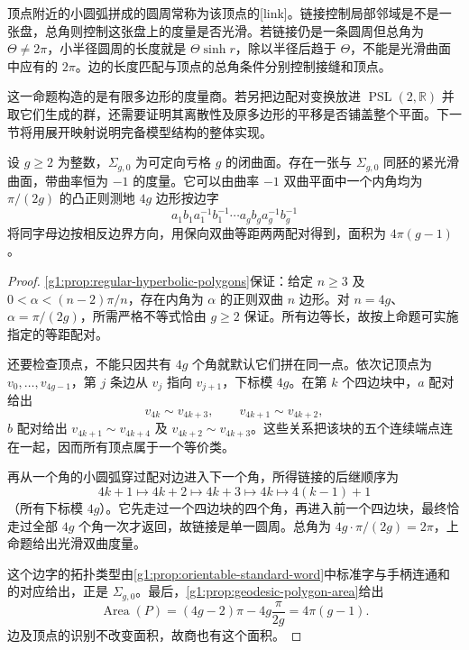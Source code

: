 顶点附近的小圆弧拼成的圆周常称为该顶点的[link]。链接控制局部邻域是不是一张盘，总角则控制这张盘上的度量是否光滑。若链接仍是一条圆周但总角为 \(\Theta\ne2\pi\)，小半径圆周的长度就是 \(\Theta\sinh r\)，除以半径后趋于 \(\Theta\)，不能是光滑曲面中应有的 \(2\pi\)。边的长度匹配与顶点的总角条件分别控制接缝和顶点。

\ProseParagraphBreak

这一命题构造的是有限多边形的度量商。若另把边配对变换放进 \(\operatorname{PSL}(2,\mathbb R)\) 并取它们生成的群，还需要证明其离散性及原多边形的平移是否铺盖整个平面。下一节将用展开映射说明完备模型结构的整体实现。

\begin{theorem}\label{g1:thm:closed-hyperbolic-polygon}
	设 \(g\ge2\) 为整数，\(\Sigma_{g,0}\) 为可定向亏格 \(g\) 的闭曲面。存在一张与 \(\Sigma_{g,0}\) 同胚的紧光滑曲面，带曲率恒为 \(-1\) 的度量。它可以由曲率 \(-1\) 双曲平面中一个内角均为 \(\pi/(2g)\) 的凸正则测地 \(4g\) 边形按边字
	\[
		a_1b_1a_1^{-1}b_1^{-1}\cdots a_gb_ga_g^{-1}b_g^{-1}
	\]
	将同字母边按相反边界方向，用保向双曲等距两两配对得到，面积为 \(4\pi(g-1)\)。
\end{theorem}
\begin{proof}
	\cref{g1:prop:regular-hyperbolic-polygons}保证：给定 \(n\ge3\) 及 \(0<\alpha<(n-2)\pi/n\)，存在内角为 \(\alpha\) 的正则双曲 \(n\) 边形。对 \(n=4g\)、\(\alpha=\pi/(2g)\)，所需严格不等式恰由 \(g\ge2\) 保证。所有边等长，故按上命题可实施指定的等距配对。

	还要检查顶点，不能只因共有 \(4g\) 个角就默认它们拼在同一点。依次记顶点为 \(v_0,\ldots,v_{4g-1}\)，第 \(j\) 条边从 \(v_j\) 指向 \(v_{j+1}\)，下标模 \(4g\)。在第 \(k\) 个四边块中，\(a\) 配对给出
	\[
		v_{4k}\sim v_{4k+3},\qquad v_{4k+1}\sim v_{4k+2},
	\]
	\(b\) 配对给出 \(v_{4k+1}\sim v_{4k+4}\) 及 \(v_{4k+2}\sim v_{4k+3}\)。这些关系把该块的五个连续端点连在一起，因而所有顶点属于一个等价类。

	再从一个角的小圆弧穿过配对边进入下一个角，所得链接的后继顺序为
	\[
		4k+1\longmapsto4k+2\longmapsto4k+3\longmapsto4k
		\longmapsto4(k-1)+1
	\]
	（所有下标模 \(4g\)）。它先走过一个四边块的四个角，再进入前一个四边块，最终恰走过全部 \(4g\) 个角一次才返回，故链接是单一圆周。总角为 \(4g\cdot\pi/(2g)=2\pi\)，上命题给出光滑双曲度量。

	这个边字的拓扑类型由\cref{g1:prop:orientable-standard-word}中标准字与手柄连通和的对应给出，正是 \(\Sigma_{g,0}\)。最后，\cref{g1:prop:geodesic-polygon-area}给出
	\[
		\operatorname{Area}(P)=(4g-2)\pi-4g\frac{\pi}{2g}=4\pi(g-1).
	\]
	边及顶点的识别不改变面积，故商也有这个面积。
\end{proof}

